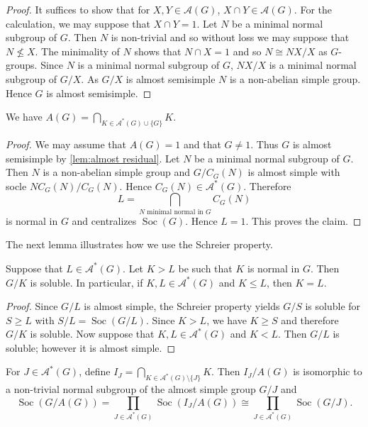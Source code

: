 \documentclass[12pt,a4paper]{amsart}
\DeclareMathOperator{\Soc}{Soc}
\begin{document}
\begin{proof} It suffices to show that for $X,Y \in \mathcal A(G)$, $X \cap Y \in \mathcal A(G)$. For the calculation, we may suppose that $X\cap Y=1$. Let $N$ be a minimal normal subgroup of $G$. Then $N$ is non-trivial and so without loss we may suppose that $N \not \le X$. The minimality of $N$ shows that $N\cap X=1$ and so $N \cong NX/X$ as $G$-groups. Since $N$ is a minimal normal subgroup of $G$, $NX/X$ is a minimal normal subgroup of $G/X$. As $G/X$ is almost semisimple $N$ is a non-abelian simple group. Hence $G$ is almost semisimple.
\end{proof}

\begin{lemma}\label{lem:AG} We have  $A(G)= \bigcap_{K\in \mathcal A^*(G)\cup \{G\}} K$.
\end{lemma}

\begin{proof} We may assume that $A(G)=1$ and that $G\ne 1$. Thus $G$ is almost semisimple by \cref{lem:almost residual}.  Let $N$ be a minimal normal subgroup of $G$. Then $N$ is a non-abelian simple group and $G/C_G(N)$ is almost simple with socle $N C_G(N)/C_G(N)$. Hence $C_G(N)\in \mathcal A^*(G)$. Therefore $$L =\bigcap_{ N \text { minimal normal  in }G}C_G(N)$$ is normal in $G$ and centralizes $\Soc(G)$. Hence $L=1$. This proves the claim.
\end{proof}

The next lemma illustrates how we use the Schreier property.

\begin{lemma}\label{lem:schreier app}
Suppose that $L \in \mathcal A^*(G)$. Let $K>L$ be such that $K$ is normal in $G$. Then $G/K$ is soluble. In particular, if $K,L\in\mathcal A^*(G)$ and $K\le L$, then $K=L$.
\end{lemma}

\begin{proof} Since $G/L$ is almost simple, the Schreier property yields $G/S$ is soluble for $S\ge L$ with $S/L=\Soc(G/L)$. Since $K>L$, we have $K\ge S$ and therefore $G/K$ is soluble. Now suppose that $K,L\in\mathcal A^*(G)$ and $K< L$. Then $G/L$ is soluble; however it is almost simple.
\end{proof}

\begin{lemma}\label{prop: G/A(G)}   For $J \in \mathcal A^*(G)$, define $I_J= \bigcap_{K\in \mathcal A^*(G)\setminus \{J\}}K$. Then $I_J/A(G)$ is isomorphic to  a non-trivial normal subgroup of the almost simple group $G/J$ and $$\Soc(G/A(G))= \prod_{J\in \mathcal A^*(G)} \Soc(I_J/A(G)) \cong \prod_{J\in \mathcal A^*(G)}\Soc (G/J).$$
\end{lemma}
\end{document}
